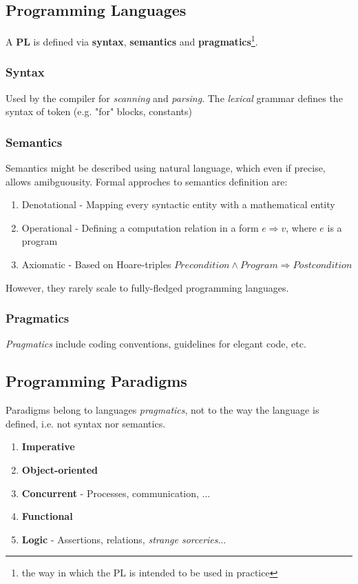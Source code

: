 \subsection{Programming Languages}
A \textbf{PL} is defined via \textbf{syntax}, \textbf{semantics} and \textbf{pragmatics}\footnote{the way in which the PL is intended to be used in practice}.
\subsubsection{Syntax}
Used by the compiler for \textit{scanning} and \textit{parsing}.
The \textit{lexical} grammar defines the syntax of token (e.g. "for" blocks, constants)
\subsubsection{Semantics}
Semantics might be described using natural language, which even if precise, allows amibguousity.
Formal approches to semantics definition are:
\begin{enumerate}
    \item Denotational - Mapping every syntactic entity with a mathematical entity
    \item Operational - Defining a computation relation in a form $e \Rightarrow v$, where $e$ is a program
    \item Axiomatic - Based on Hoare-triples $\textit{Precondition} \wedge \textit{Program}\Rightarrow \textit{Postcondition}$ 
\end{enumerate}
However, they rarely scale to fully-fledged programming languages.
\subsubsection{Pragmatics}
\textit{Pragmatics} include coding conventions, guidelines for elegant code, etc.

\subsection{Programming Paradigms}
Paradigms belong to languages \textit{pragmatics}, not to the way the language is defined, i.e. not syntax nor semantics.
\begin{enumerate}
    \item \textbf{Imperative}
    \item \textbf{Object-oriented}
    \item \textbf{Concurrent} - Processes, communication, ...
    \item \textbf{Functional}
    \item \textbf{Logic} - Assertions, relations, \textit{strange sorceries}...
\end{enumerate}


